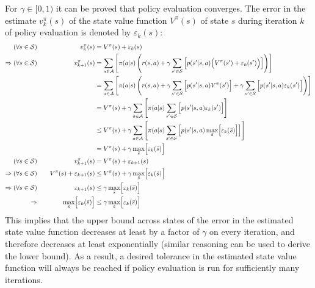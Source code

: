 For $\gamma\in[0,1)$ it can be proved that policy evaluation converges. The error in the estimate $v_k^\pi(s)$ of the state value function $V^\pi(s)$ of state $s$ during iteration $k$ of policy evaluation is denoted by $\varepsilon_k(s)$:
\begin{align*}
    (\forall s\in\mathcal{S})\quad&& v_k^\pi(s) &= V^\pi(s) + \varepsilon_k(s) \\
    \Rightarrow(\forall s\in\mathcal{S})\quad&& v_{k+1}^\pi(s) &= \sum_{a\in\mathcal{A}}{\left[ \pi(a\vert s) \left( r(s, a) + \gamma\sum_{s'\in\mathcal{S}}{\left[ p(s'\vert s, a) \Bigl( V^\pi(s') + \varepsilon_k(s') \Bigr) \right]} \right) \right]} \\
    &&&= \sum_{a\in\mathcal{A}}{\left[ \pi(a\vert s) \left( r(s, a) + \gamma\sum_{s'\in\mathcal{S}}{\Bigl[ p(s'\vert s, a) V^\pi(s') \Bigr]} + \gamma\sum_{s'\in\mathcal{S}}{\Bigl[ p(s'\vert s, a) \varepsilon_k(s') \Bigr]} \right) \right]} \\
    &&&= V^\pi(s) + \gamma\sum_{a\in\mathcal{A}}{\left[ \pi(a\vert s) \sum_{s'\in\mathcal{S}}{\Bigl[ p(s'\vert s, a) \varepsilon_k(s') \Bigr]} \right]} \\
    &&&\le V^\pi(s) + \gamma\sum_{a\in\mathcal{A}}{\left[ \pi(a\vert s) \sum_{s'\in\mathcal{S}}{\left[ p(s'\vert s, a) \max_{\bar{s}}\Bigl[\varepsilon_k(\bar{s})\Bigr] \right]} \right]} \\
    &&&= V^\pi(s) + \gamma\max_{\bar{s}}\Bigl[\varepsilon_k(\bar{s})\Bigr] \\
    (\forall s\in\mathcal{S})\quad&& v_{k+1}^\pi(s) &= V^\pi(s) + \varepsilon_{k+1}(s) \\
    \Rightarrow(\forall s\in\mathcal{S})\quad&& V^\pi(s) + \varepsilon_{k+1}(s) &\le V^\pi(s) + \gamma\max_{\bar{s}}\Bigl[\varepsilon_k(\bar{s})\Bigr] \\
    \Rightarrow(\forall s\in\mathcal{S})\quad&& \varepsilon_{k+1}(s) &\le \gamma\max_{\bar{s}}\Bigl[\varepsilon_k(\bar{s})\Bigr] \\
    \Rightarrow\quad&& \max_{\bar{s}}\Bigl[\varepsilon_k(\bar{s})\Bigr] &\le \gamma\max_{\bar{s}}\Bigl[\varepsilon_k(\bar{s})\Bigr]
\end{align*}
This implies that the upper bound across states of the error in the estimated state value function decreases at least by a factor of $\gamma$ on every iteration, and therefore decreases at least exponentially (similar reasoning can be used to derive the lower bound). As a result, a desired tolerance in the estimated state value function will always be reached if policy evaluation is run for sufficiently many iterations.
